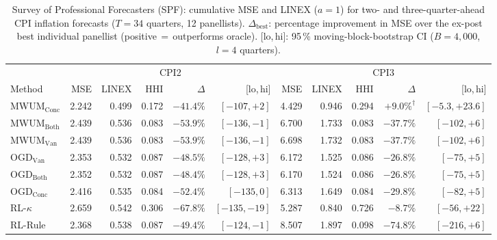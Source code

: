 \documentclass[a4paper,12pt]{article}
\begin{document}
\clearpage

\begin{table}[htbp]
\centering
\caption{Survey of Professional Forecasters (SPF): cumulative MSE and LINEX ($a{=}1$)
  for two- and three-quarter-ahead CPI inflation forecasts ($T{=}34$ quarters, 12 panellists).
  $\Delta_\text{best}$: percentage improvement in MSE over the ex-post best individual
  panellist (positive\,$=$\,outperforms oracle).
  [lo,\,hi]: 95\,\% moving-block-bootstrap CI
  ($B{=}4{,}000$, $l{=}4$ quarters).}
\label{tab:spf}
\setlength{\tabcolsep}{3pt}\renewcommand{\arraystretch}{1.15}\footnotesize
\begin{tabular}{l rrrr>{\scriptsize}r rrrr>{\scriptsize}r}
\toprule
& \multicolumn{5}{c}{CPI2} & \multicolumn{5}{c}{CPI3} \\
\cmidrule(lr){2-6}\cmidrule(lr){7-11}
Method & MSE & LINEX & HHI & $\Delta$ & [lo,\,hi] & MSE & LINEX & HHI & $\Delta$ & [lo,\,hi] \\
\midrule
MWUM$_\text{Conc}$  & 2.242 & 0.499 & 0.172 & $-41.4\%$ & $[-107,+2]$   & 4.429 & 0.946 & 0.294 & $+9.0\%^{\dagger}$ & $[-5.3,+23.6]$ \\
MWUM$_\text{Both}$  & 2.439 & 0.536 & 0.083 & $-53.9\%$ & $[-136,-1]$   & 6.700 & 1.733 & 0.083 & $-37.7\%$          & $[-102,+6]$    \\
MWUM$_\text{Van}$   & 2.439 & 0.536 & 0.083 & $-53.9\%$ & $[-136,-1]$   & 6.698 & 1.732 & 0.083 & $-37.7\%$          & $[-102,+6]$    \\
\cmidrule(lr){1-11}
OGD$_\text{Van}$    & 2.353 & 0.532 & 0.087 & $-48.5\%$ & $[-128,+3]$   & 6.172 & 1.525 & 0.086 & $-26.8\%$          & $[-75,+5]$     \\
OGD$_\text{Both}$   & 2.352 & 0.532 & 0.087 & $-48.4\%$ & $[-128,+3]$   & 6.170 & 1.524 & 0.086 & $-26.8\%$          & $[-75,+5]$     \\
OGD$_\text{Conc}$   & 2.416 & 0.535 & 0.084 & $-52.4\%$ & $[-135,0]$    & 6.313 & 1.649 & 0.084 & $-29.8\%$          & $[-82,+5]$     \\
\cmidrule(lr){1-11}
RL-$\kappa$         & 2.659 & 0.542 & 0.306 & $-67.8\%$ & $[-135,-19]$  & 5.287 & 0.840 & 0.726 & $-8.7\%$           & $[-56,+22]$    \\
RL-Rule             & 2.368 & 0.538 & 0.087 & $-49.4\%$ & $[-124,-1]$   & 8.507 & 1.897 & 0.098 & $-74.8\%$          & $[-216,+6]$    \\

\end{tabular}
\end{table}
\end{document}
